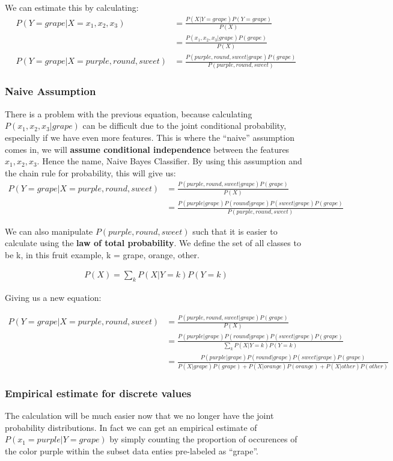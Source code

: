 \documentclass{article}
\begin{document}
We can estimate this by calculating: 
\begin{align*}
P(Y=grape|X=x_{1},x_{2},x_{3})&=\frac{P(X|Y=grape)P(Y=grape)}{P(X)}\\
&= \frac{P(x_{1},x_{2},x_{3}|grape)P(grape)}{P(X)}\\
P(Y=grape|X=purple,round,sweet) &= \frac{P(purple,round,sweet|grape)P(grape)}{P(purple,round,sweet)}
\end{align*}

\subsubsection{Naive Assumption}
There is a problem with the previous equation, because calculating $P(x_{1},x_{2},x_{3}|grape)$ can be difficult due to the joint conditional probability, especially if we have even more features. This is where the ``naive'' assumption comes in, we will \textbf{assume conditional independence} between the features $x_{1},x_{2},x_{3}$. Hence the name, Naive Bayes Classifier. By using this assumption and the chain rule for probability, this will give us:
\begin{align*}
P(Y=grape|X=purple,round,sweet)&= \frac{P(purple,round,sweet|grape)P(grape)}{P(X)}\\
&= \frac{P(purple|grape)P(round|grape)P(sweet|grape)P(grape)}{P(purple,round,sweet)}
\end{align*}

We can also manipulate $P(purple,round,sweet)$ such that it is easier to calculate using the \textbf{law of total probability}. We define the set of all classes to be k, in this fruit example, k = {grape, orange, other}. 

\begin{align*}
P(X) = \sum_{k} P(X|Y=k)P(Y=k)
\end{align*}

Giving us a new equation:

\begin{align*}
P(Y=grape|X=purple,round,sweet)&= \frac{P(purple,round,sweet|grape)P(grape)}{P(X)}\\
&= \frac{P(purple|grape)P(round|grape)P(sweet|grape)P(grape)}{\sum_{k} P(X|Y=k)P(Y=k)}\\
&= \frac{P(purple|grape)P(round|grape)P(sweet|grape)P(grape)}{P(X|grape)P(grape)+P(X|orange)P(orange)+P(X|other)P(other)}
\end{align*}

\subsubsection{Empirical estimate for discrete values}
The calculation will be much easier now that we no longer have the joint probability distributions. In fact we can get an empirical estimate of $P(x_{1} = purple|Y=grape)$ by simply counting the proportion of occurences of the color purple within the subset data enties pre-labeled as ``grape''.\newline
\end{document}
